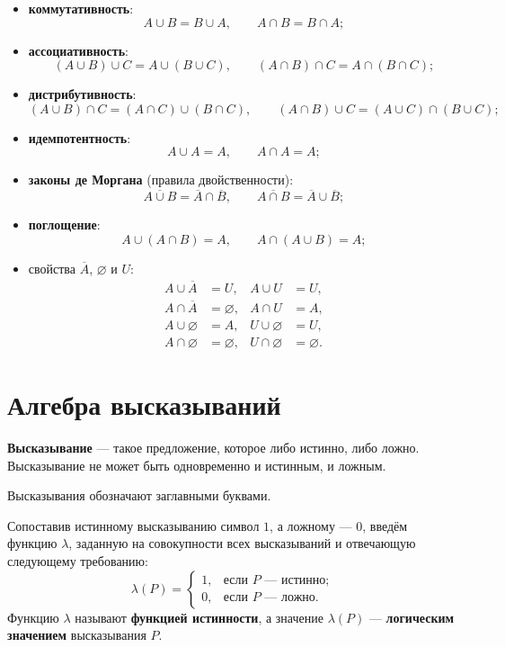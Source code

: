 \documentclass[a4paper, 12pt]{article}
\begin{document}
\begin{itemize}[noitemsep]
  \item \textbf{коммутативность}:
    \[ A \cup B = B \cup A, \qquad A \cap B = B \cap A; \]
  \item \textbf{ассоциативность}:
    \[ (A \cup B) \cup C = A \cup (B \cup C), \qquad
       (A \cap B) \cap C = A \cap (B \cap C); \]
  \item \textbf{дистрибутивность}:
    \[ (A \cup B) \cap C = (A \cap C) \cup (B \cap C), \qquad
       (A \cap B) \cup C = (A \cup C) \cap (B \cup C); \]
  \item \textbf{идемпотентность}:
    \[ A \cup A = A, \qquad A \cap A = A; \]
  \item \textbf{законы де Моргана} (правила двойственности):
    \[ \overline{A \cup B} = \overline{A} \cap \overline{B}, \qquad
       \overline{A \cap B} = \overline{A} \cup \overline{B}; \]
  \item \textbf{поглощение}:
    \[ A \cup (A \cap B) = A, \qquad A \cap (A \cup B) = A; \]
  \item свойства $\overline{A}$, $\varnothing$ и $U$: %
    \[
      \begin{aligned}
        A \cup \overline{A} &= U, & A \cup U &= U, \\
        A \cap \overline{A} &= \varnothing, & A \cap U &= A, \\
        A \cup \varnothing &= A, & U \cup \varnothing &= U, \\
        A \cap \varnothing &= \varnothing, & U \cap \varnothing &= \varnothing.
      \end{aligned}
    \]
\end{itemize}

\section{Алгебра высказываний}

\textbf{Высказывание} --- такое предложение, которое либо истинно, либо ложно.
Высказывание не может быть одновременно и истинным, и ложным.

Высказывания обозначают заглавными буквами.

Сопоставив истинному высказыванию символ $1$, а ложному --- $0$, введём
функцию $\lambda$, заданную на совокупности всех высказываний и отвечающую
следующему требованию:
\[
  \lambda(P) =
  \begin{cases}
    1, & \text{если } P \text{ --- истинно};\\
    0, & \text{если } P \text{ --- ложно}.
  \end{cases}
\]
Функцию $\lambda$ называют \textbf{функцией истинности}, а значение
$\lambda(P)$ --- \textbf{логическим значением} высказывания $P$.
\end{document}
